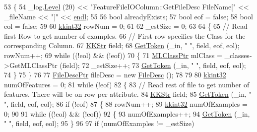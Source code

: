 \begin{DoxyCode}
53 \{
54   \_log.\hyperlink{class_k_k_b_1_1_run_log_a32cf761d7f2e747465fd80533fdbb659}{Level} (20) << \textcolor{stringliteral}{"FeatureFileIOColumn::GetFileDesc    FileName["} << \_fileName << \textcolor{stringliteral}{"]"} << 
      \hyperlink{namespace_k_k_b_ad1f50f65af6adc8fa9e6f62d007818a8}{endl};
55 
56   \textcolor{keywordtype}{bool}  alreadyExists;
57   \textcolor{keywordtype}{bool}  eof = \textcolor{keyword}{false};
58   \textcolor{keywordtype}{bool}  eol = \textcolor{keyword}{false};
59  
60   \hyperlink{namespace_k_k_b_a8fa4952cc84fda1de4bec1fbdd8d5b1b}{kkint32}  rowNum = 0;
61 
62   \_estSize = 0;
63 
64   \{
65     \textcolor{comment}{// Read first Row to get number of examples.}
66     \textcolor{comment}{// First row specifies the Class for the corresponding Column.}
67     \hyperlink{class_k_k_b_1_1_k_k_str}{KKStr}  field;
68     \hyperlink{class_k_k_m_l_l_1_1_feature_file_i_o_ae79ac82b32e63fa7e7d96c833b5631f2}{GetToken} (\_in, \textcolor{stringliteral}{" "}, field, eof, eol);  rowNum++;
69     \textcolor{keywordflow}{while}  ((!eol)  &&  (!eof))
70     \{
71       \hyperlink{class_k_k_m_l_l_1_1_m_l_class}{MLClassPtr}  mlClass = \_classes->GetMLClassPtr (field);
72       \_estSize++;
73       \hyperlink{class_k_k_m_l_l_1_1_feature_file_i_o_ae79ac82b32e63fa7e7d96c833b5631f2}{GetToken} (\_in, \textcolor{stringliteral}{" "}, field, eof, eol);
74     \}
75   \}
76 
77   \hyperlink{class_k_k_m_l_l_1_1_file_desc}{FileDescPtr}  fileDesc = \textcolor{keyword}{new} \hyperlink{class_k_k_m_l_l_1_1_file_desc}{FileDesc} ();
78 
79 
80   \hyperlink{namespace_k_k_b_a8fa4952cc84fda1de4bec1fbdd8d5b1b}{kkint32}  numOfFeatures = 0;
81   \textcolor{keywordflow}{while}  (!eof)
82   \{
83     \textcolor{comment}{// Read rest of file to get number of features.  There will be on row per attribute.}
84     \hyperlink{class_k_k_b_1_1_k_k_str}{KKStr}  field;
85     \hyperlink{class_k_k_m_l_l_1_1_feature_file_i_o_ae79ac82b32e63fa7e7d96c833b5631f2}{GetToken} (\_in, \textcolor{stringliteral}{" "}, field, eof, eol); 
86     \textcolor{keywordflow}{if}  (!eof)
87     \{
88       rowNum++;
89       \hyperlink{namespace_k_k_b_a8fa4952cc84fda1de4bec1fbdd8d5b1b}{kkint32}  numOfExamples = 0;
90 
91       \textcolor{keywordflow}{while}  ((!eol)  &&  (!eof))
92       \{
93         numOfExamples++;
94         \hyperlink{class_k_k_m_l_l_1_1_feature_file_i_o_ae79ac82b32e63fa7e7d96c833b5631f2}{GetToken} (\_in, \textcolor{stringliteral}{" "}, field, eof, eol);
95       \}
96 
97       \textcolor{keywordflow}{if}  (numOfExamples != \_estSize)

\end{DoxyCode}
